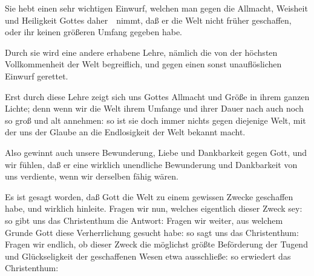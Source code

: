 \begin{aufza}
\begin{aufzb}
\item Sie hebt einen sehr wichtigen Einwurf, welchen man gegen die Allmacht, Weisheit und Heiligkeit Gottes daher~\ nimmt, daß er die Welt nicht früher geschaffen, oder ihr keinen größeren Umfang gegeben habe.
\item Durch sie wird eine andere erhabene Lehre, nämlich die von der höchsten Vollkommenheit der Welt begreiflich, und gegen einen sonst unauflöslichen Einwurf gerettet.
\item Erst durch diese Lehre zeigt sich uns Gottes Allmacht und Größe in ihrem ganzen Lichte; denn wenn wir die Welt ihrem Umfange und ihrer Dauer nach auch noch so groß und alt annehmen: so ist sie doch immer nichts gegen diejenige Welt, mit der uns der Glaube an die Endlosigkeit der Welt bekannt macht.
\item Also gewinnt auch unsere Bewunderung, Liebe und Dankbarkeit gegen Gott, und wir fühlen, daß er eine wirklich unendliche Bewunderung und Dankbarkeit von uns verdiente, wenn wir derselben fähig wären.
\end{aufzb}
\end{aufza}

Es ist gesagt worden, daß Gott die Welt zu einem gewissen Zwecke geschaffen habe, und wirklich hinleite. Fragen wir nun, welches eigentlich dieser Zweck sey: so gibt uns das Christenthum die Antwort:  Fragen wir weiter, aus welchem Grunde Gott diese Verherrlichung gesucht habe: so sagt uns das Christenthum:  Fragen wir endlich, ob dieser Zweck die möglichst größte Beförderung der Tugend und Glückseligkeit der geschaffenen Wesen etwa ausschließe: so erwiedert das Christenthum: 


